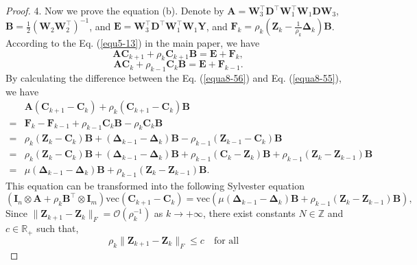 \begin{proof}
4. Now we prove the equation (b). Denote by $\bm{A}=\bm{W}_{3}^{\top}\bm{D}^{\top}\bm{W}_{1}^{\top}\bm{W}_{1}\bm{D}\bm{W}_{3}$, $\bm{B}=\frac{1}{2}(\bm{W}_{2}\bm{W}_{2}^{\top})^{-1}$, and $\bm{E}=\bm{W}_{3}^{\top}\bm{D}^{\top}\bm{W}_{1}^{\top}\bm{W}_{1}\bm{Y}$, and $\bm{F}_{k}=\rho_{k}(\bm{Z}_{k} -\frac{1}{\rho_{k}}\bm{\Delta}_{k})\bm{B}$. According to the Eq. (\ref{equ5-13}) in the main paper, we have
\begin{equation}
\label{equa8-55}
\bm{A}\bm{C}_{k+1}
+
\rho_{k}\bm{C}_{k+1}\bm{B}
=
\bm{E}
+
\bm{F}_{k},
\end{equation}
\begin{equation}
\label{equa8-56}
\bm{A}\bm{C}_{k}
+
\rho_{k-1}\bm{C}_{k}\bm{B}
=
\bm{E}
+
\bm{F}_{k-1}.
\end{equation}
By calculating the difference between the Eq. (\ref{equa8-56}) and Eq. (\ref{equa8-55}), we have
\begin{equation}
\begin{split}
\label{equa8-57}
&
\bm{A}
(\bm{C}_{k+1} - \bm{C}_{k})
+
\rho_{k}
(\bm{C}_{k+1} - \bm{C}_{k})
\bm{B}
\\
=
&
\bm{F}_{k}
-
\bm{F}_{k-1}
+
\rho_{k-1}\bm{C}_{k}\bm{B}
-
\rho_{k}\bm{C}_{k}\bm{B}
\\
=
&
\rho_{k}(\bm{Z}_{k}-\bm{C}_{k})\bm{B}
+
(\bm{\Delta}_{k-1}-\bm{\Delta}_{k})\bm{B}
-
\rho_{k-1}(\bm{Z}_{k-1}-\bm{C}_{k})\bm{B}
\\
=
&
\rho_{k}(\bm{Z}_{k}-\bm{C}_{k})\bm{B}
+
(\bm{\Delta}_{k-1}-\bm{\Delta}_{k})\bm{B}
+
\rho_{k-1}(\bm{C}_{k}-\bm{Z}_{k})\bm{B}
+
\rho_{k-1}(\bm{Z}_{k}-\bm{Z}_{k-1})\bm{B}
\\
=
&
\mu(\bm{\Delta}_{k-1}-\bm{\Delta}_{k})\bm{B}
+
\rho_{k-1}(\bm{Z}_{k}-\bm{Z}_{k-1})\bm{B}.
\end{split}
\end{equation}
This equation can be transformed into the following Sylvester equation 
\begin{equation}
\label{equa8-58}
(\bm{I}_{n}\otimes\mathbf{A}
+
\rho_{k}\bm{B}^{\top}\otimes\mathbf{I}_{m})\text{vec}(\bm{C}_{k+1} - \bm{C}_{k})
=
\text{vec}(\mu(\bm{\Delta}_{k-1}-\bm{\Delta}_{k})\bm{B}+\rho_{k-1}(\bm{Z}_{k}-\bm{Z}_{k-1})\bm{B}),
\end{equation}
Since $\|\bm{Z}_{k+1}-\bm{Z}_{k}\|_{F}=\mathcal{O}(\rho_{k}^{-1})$ as $k \to +\infty$, there exist constants $N\in\mathbb{Z}$ and $c\in\mathbb{R}_{+}$ such that,
\begin{equation}
\label{equa8-59}
\rho_{k}\|\bm{Z}_{k+1}-\bm{Z}_{k}\|_{F}
\le
c
\quad 
\text{for all}
\quad

\end{equation}
\end{proof}
